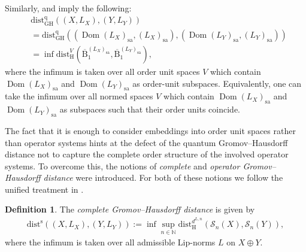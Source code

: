 \documentclass{amsart}
\theoremstyle{plain}
\theoremstyle{definition}
\newtheorem{definition}[theorem]{Definition}
\theoremstyle{remark}
\DeclareMathOperator{\Dom}{Dom}
\begin{document}
	Similarly, \cite[Lemma 2.12]{KK22} and \cite[Proposition 4.7]{Li06} imply the following:
	\begin{align}
		&\mathrm{dist}_\mathrm{GH}^\mathrm{q}((X,L_X),(Y,L_Y)) \\
		&= \mathrm{dist}_\mathrm{GH}^\mathrm{q}((\Dom(L_X)_\mathrm{sa},(L_X)_\mathrm{sa}), (\Dom(L_Y)_\mathrm{sa},(L_Y)_\mathrm{sa})) \\
		&= \inf \mathrm{dist}_\mathrm{H}^V \left(\overline{\mathrm{B}}_1^{(L_X)_\mathrm{sa}}, \overline{\mathrm{B}}_1^{(L_Y)_\mathrm{sa}}\right),
	\end{align}
	where the infimum is taken over all order unit spaces $V$ which contain $\Dom(L_X)_\mathrm{sa}$ and $\Dom(L_Y)_\mathrm{sa}$ as order-unit subspaces.
	Equivalently, one can take the infimum over all normed spaces $V$ which contain $\Dom(L_X)_\mathrm{sa}$ and $\Dom(L_Y)_\mathrm{sa}$ as subspaces such that their order units coincide.
	
	The fact that it is enough to consider embeddings into order unit spaces rather than operator systems hints at the defect of the quantum Gromov--Hausdorff distance not to capture the complete order structure of the involved operator systems.
	To overcome this, the notions of \emph{complete} \cite{Ker03} and \emph{operator Gromov--Hausdorff distance} \cite{Li06} were introduced.
	For both of these notions we follow the unified treatment in \cite{KL07}.
	
	\begin{definition}\label{def:Complete-GH-distance}
		The \emph{complete Gromov--Hausdorff distance} is given by
		\begin{align}
			\mathrm{dist}^\mathrm{s}((X,L_X),(Y,L_Y))
			:= \inf \sup_{n \in \mathbb{N}} \mathrm{dist}_\mathrm{H}^{d^{L,n}}(\mathcal{S}_n(X),\mathcal{S}_n(Y)),
		\end{align}
		where the infimum is taken over all admissible Lip-norms $L$ on $X \oplus Y$.
	\end{definition}
	
\end{document}
